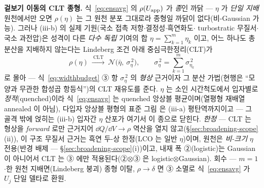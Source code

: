 \begin{bgbox}
\textbf{겉보기 이동의 CLT 종형.} 식~\eqref{eq:ensavg} 의 $\rho(U_{\mathrm{app}})$ 가 \emph{종}인 까닭 ---
$\eta$ 가 \emph{단일 지배} 원천에서만 오면 $\rho(\eta)$ 는 그 원천 분포 그대로라 종형일 까닭이
없다(비-Gaussian 가능). 그러나 (iii-b) 의 실제 기원(국소 접촉 저항$\cdot$결정성$\cdot$흑연화도$\cdot$%
turbostratic 무질서$\cdot$국소 과전압)은 성격이 다른 \emph{다수 독립} 기여의 합 $\eta=\sum_{k=1}^{m}\eta_k$
이고, 어느 하나도 총분산을 지배하지 않는다는 Lindeberg 조건 아래 중심극한정리(CLT)가
\[
\rho(\eta)\ \xrightarrow{\ \text{CLT}\ }\ \mathcal N\!\big(\bar\eta,\ \sigma_\eta^{\,2}\big),
\qquad
\sigma_\eta^{\,2}=\sum_{k=1}^{m}\sigma_{\eta_k}^{\,2}
\]
로 몰아 --- 식~\eqref{eq:widthbudget} ③ 항 $\sigma_\eta^{\,2}$ 의 \emph{형상} 근거이자 그 분산
가법(현행은 ``모양과 무관한 합성곱 항등식'')의 CLT 재유도를 준다. $\eta$ 는 소인 시간척도에서 입자별로
\emph{정적}(quenched)이라 식~\eqref{eq:ensavg} 는 quenched 앙상블 평균이며(열평형 재배열 annealed 이
아님), 다입자 앙상블 평형의 표준 그림\cite{dreyer2010,dreyer2011} 은 (iii-a) 평탄역까지이고 --- 그 골격 밖에 얹히는 (iii-b) 입자간 $\eta$ 산포가 여기서 이
종으로 닫힌다. \emph{한정} --- CLT 는 형상을 \emph{forward} 로만 근거지어 $\dd Q/\dd V\!\to\!\rho$
역산을 열지 않고(\S\ref{sec:broadening-scope}(ii)), 이 구조 무질서 근거는 흑연 두-상 한정(LCO 는 일반
$\eta$)이며, 원천은 \emph{비-크기} $\eta$ 전용(반경 배제 --- \S\ref{sec:broadening-scope}(i))이고,
내재 폭 ②(logistic)는 Gaussian 이 아니어서 CLT 는 ③ 에만 적용된다(②$\otimes$③ 은
logistic$\otimes$Gaussian). 회수 --- $m=1$$\cdot$한 원천 지배면(Lindeberg 붕괴) 종형 이탈,
$\rho\!\to\!\delta$ 면 ③ 소멸로 식~\eqref{eq:ensavg} 가 $U_j$ 단일 델타로 환원.
\end{bgbox}


